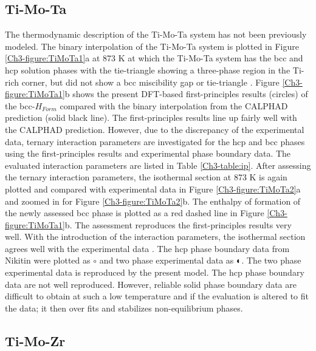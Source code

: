 \subsection{Ti-Mo-Ta}

The thermodynamic description of the Ti-Mo-Ta system has not been previously modeled. The binary interpolation of the Ti-Mo-Ta system is plotted in Figure \ref{Ch3-figure:TiMoTa1}a at 873 K at which the Ti-Mo-Ta system has the bcc and hcp solution phases with the tie-triangle showing a three-phase region in the Ti-rich corner, but did not show a bcc miscibility gap or tie-triangle \cite{Nikitin1971}. Figure \ref{Ch3-figure:TiMoTa1}b shows the present DFT-based first-principles results (circles) of the bcc-$H_{Form}$ compared with the binary interpolation from the CALPHAD prediction (solid black line). The first-principles results line up fairly well with the CALPHAD prediction. However, due to the discrepancy of the experimental data, ternary interaction parameters are investigated for the hcp and bcc phases using the first-principles results and experimental phase boundary data. The evaluated interaction parameters are listed in Table \ref{Ch3-table:ip}. After assessing the ternary interaction parameters, the isothermal section at 873 K is again plotted and compared with experimental data in Figure \ref{Ch3-figure:TiMoTa2}a and zoomed in for Figure \ref{Ch3-figure:TiMoTa2}b. The enthalpy of formation of the newly assessed bcc phase is plotted as a red dashed line in Figure \ref{Ch3-figure:TiMoTa1}b. The assessment reproduces the first-principles results very well. With the introduction of the interaction parameters, the isothermal section agrees well with the experimental data \cite{Nikitin1971}. The hcp phase boundary data from Nikitin \cite{Nikitin1971} were plotted as $\circ$ and two phase experimental data as $\LEFTcircle$. The two phase experimental data is reproduced by the present model. The hcp phase boundary data are not well reproduced. However, reliable solid phase boundary data are difficult to obtain at such a low temperature and if the evaluation is altered to fit the data; it then over fits and stabilizes non-equilibrium phases. 

\subsection{Ti-Mo-Zr}

